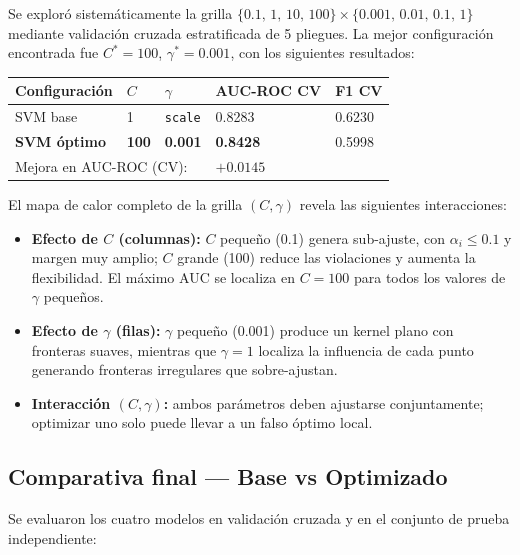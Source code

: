 \documentclass[spanish]{article}
\begin{document}
Se exploró sistemáticamente la grilla $\{0.1,\,1,\,10,\,100\} \times \{0.001,\,0.01,\,0.1,\,1\}$ mediante validación cruzada estratificada de 5 pliegues. La mejor configuración encontrada fue $C^* = 100$, $\gamma^* = 0.001$, con los siguientes resultados:

\begin{center}
\begin{tabular}{lllll}
\toprule
\textbf{Configuración} & \textbf{$C$} & \textbf{$\gamma$} & \textbf{AUC-ROC CV} & \textbf{F1 CV} \\
\midrule
SVM base    & 1   & \texttt{scale} & 0.8283 & 0.6230 \\
\textbf{SVM óptimo} & \textbf{100} & \textbf{0.001} & \textbf{0.8428} & 0.5998 \\
\midrule
\multicolumn{3}{l}{Mejora en AUC-ROC (CV):} & \multicolumn{2}{l}{$+0.0145$} \\
\bottomrule
\end{tabular}
\end{center}

El mapa de calor completo de la grilla $(C, \gamma)$ revela las siguientes interacciones:

\begin{itemize}
    \item \textbf{Efecto de $C$ (columnas):} $C$ pequeño (0.1) genera sub-ajuste, con $\alpha_i \leq 0.1$ y margen muy amplio; $C$ grande (100) reduce las violaciones y aumenta la flexibilidad. El máximo AUC se localiza en $C = 100$ para todos los valores de $\gamma$ pequeños.
    \item \textbf{Efecto de $\gamma$ (filas):} $\gamma$ pequeño (0.001) produce un kernel plano con fronteras suaves, mientras que $\gamma = 1$ localiza la influencia de cada punto generando fronteras irregulares que sobre-ajustan.
    \item \textbf{Interacción $(C, \gamma)$:} ambos parámetros deben ajustarse conjuntamente; optimizar uno solo puede llevar a un falso óptimo local.
\end{itemize}

\subsection{Comparativa final — Base vs Optimizado}

Se evaluaron los cuatro modelos en validación cruzada y en el conjunto de prueba independiente:
\end{document}
